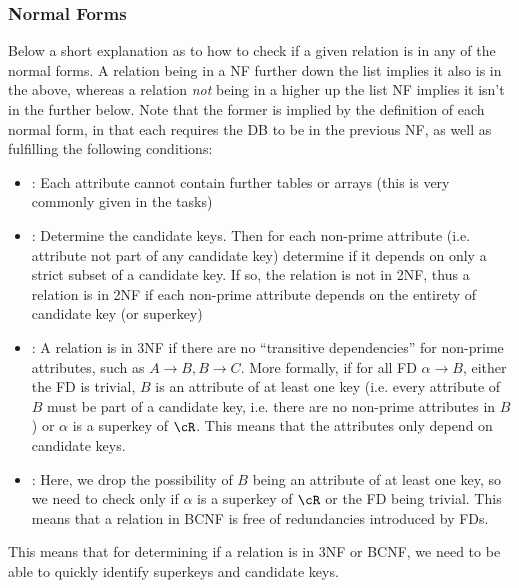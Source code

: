 \subsubsection{Normal Forms}
Below a short explanation as to how to check if a given relation is in any of the normal forms.
A relation being in a NF further down the list implies it also is in the above,
whereas a relation \textit{not} being in a higher up the list NF implies it isn't in the further below.
Note that the former is implied by the definition of each normal form, in that each requires the DB to be in the previous NF, as well as fulfilling the following conditions:
\begin{itemize}
    \item {}: Each attribute cannot contain further tables or arrays (this is very commonly given in the tasks)
    \item {}: Determine the candidate keys. Then for each non-prime attribute (i.e. attribute not part of any candidate key) determine if it depends on
          only a strict subset of a candidate key. If so, the relation is not in 2NF,
          thus a relation is in 2NF if each non-prime attribute depends on the entirety of  candidate key (or superkey)
    \item {}: A relation is in 3NF if there are no ``transitive dependencies'' for non-prime attributes, such as $A \rightarrow B, B \rightarrow C$.
          More formally, if for all FD $\alpha \rightarrow B$, either the FD is trivial, $B$ is an attribute of at least one key
          (i.e. every attribute of $B$ must be part of a candidate key, i.e. there are no non-prime attributes in $B$) or $\alpha$ is a superkey of $\cR$.
          This means that the attributes only depend on candidate keys.
    \item {}: Here, we drop the possibility of $B$ being an attribute of at least one key, so we need to check only if $\alpha$ is a superkey of $\cR$ or the FD being trivial.
          This means that a relation in BCNF is free of redundancies introduced by FDs.
\end{itemize}
This means that for determining if a relation is in 3NF or BCNF, we need to be able to quickly identify superkeys and candidate keys.


